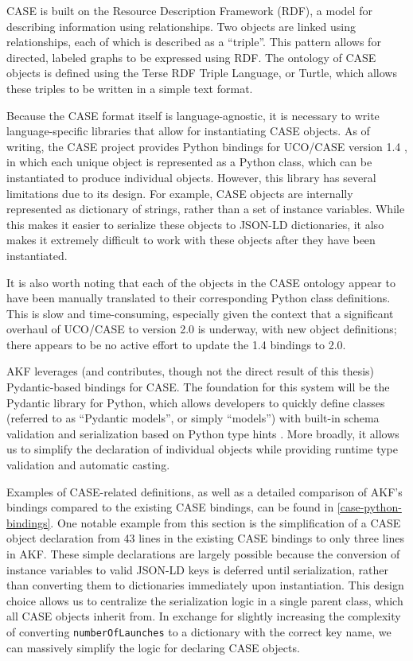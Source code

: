 \documentclass[letterpaper,12pt]{report}
\newcommand{\passthrough}[1]{#1}
\begin{document}
CASE is built on the Resource Description Framework (RDF), a model for
describing information using relationships. Two objects are linked using
relationships, each of which is described as a ``triple''. This pattern
allows for directed, labeled graphs to be expressed using RDF. The
ontology of CASE objects is defined using the Terse RDF Triple Language,
or Turtle, which allows these triples to be written in a simple text
format.

Because the CASE format itself is language-agnostic, it is necessary to
write language-specific libraries that allow for instantiating CASE
objects. As of writing, the CASE project provides Python bindings for
UCO/CASE version 1.4 \cite{CaseworkCASEMappingPython}, in which each
unique object is represented as a Python class, which can be
instantiated to produce individual objects. However, this library has
several limitations due to its design. For example, CASE objects are
internally represented as dictionary of strings, rather than a set of
instance variables. While this makes it easier to serialize these
objects to JSON-LD dictionaries, it also makes it extremely difficult to
work with these objects after they have been instantiated.

It is also worth noting that each of the objects in the CASE ontology
appear to have been manually translated to their corresponding Python
class definitions. This is slow and time-consuming, especially given the
context that a significant overhaul of UCO/CASE to version 2.0 is
underway, with new object definitions; there appears to be no active
effort to update the 1.4 bindings to 2.0.

AKF leverages (and contributes, though not the direct result of this
thesis) Pydantic-based bindings for CASE. The foundation for this system
will be the Pydantic library for Python, which allows developers to
quickly define classes (referred to as ``Pydantic models'', or simply
``models'') with built-in schema validation and serialization based on
Python type hints \cite{colvinPydantic2024}. More broadly, it allows
us to simplify the declaration of individual objects while providing
runtime type validation and automatic casting.

Examples of CASE-related definitions, as well as a detailed comparison
of AKF's bindings compared to the existing CASE bindings, can be found
in \autoref{case-python-bindings}. One notable
example from this section is the simplification of a CASE object
declaration from 43 lines in the existing CASE bindings to only three
lines in AKF. These simple declarations are largely possible because the
conversion of instance variables to valid JSON-LD keys is deferred until
serialization, rather than converting them to dictionaries immediately
upon instantiation. This design choice allows us to centralize the
serialization logic in a single parent class, which all CASE objects
inherit from. In exchange for slightly increasing the complexity of
converting \passthrough{\lstinline!numberOfLaunches!} to a dictionary
with the correct key name, we can massively simplify the logic for
declaring CASE objects.
\end{document}
